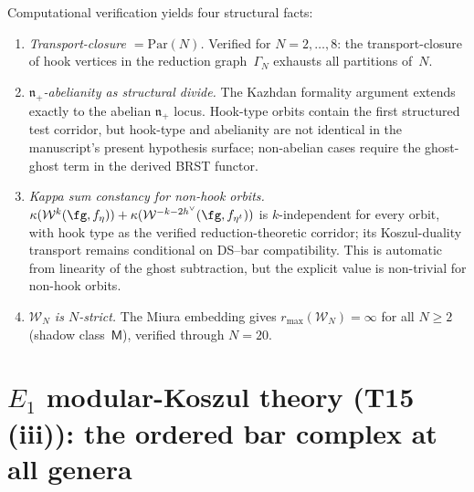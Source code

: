 \begin{remark}
\label{rem:transport-closure-diagnostics}
Computational verification yields four structural facts:
\begin{enumerate}[label=\textup{(\roman*)},nosep]
\item \emph{Transport-closure $= \mathrm{Par}(N)$.}
 Verified for $N = 2, \ldots, 8$: the transport-closure
 of hook vertices in the reduction graph~$\Gamma_N$
 exhausts all partitions of~$N$.
\item \emph{$\mathfrak{n}_+$-abelianity as structural divide.}
 The Kazhdan formality argument extends exactly to the abelian
 $\mathfrak{n}_+$ locus. Hook-type orbits contain the first structured
 test corridor, but hook-type and abelianity are not identical in the
 manuscript's present hypothesis surface; non-abelian cases require
 the ghost-ghost term in the derived BRST functor.
\item \emph{Kappa sum constancy for non-hook orbits.}
	 $\kappa(\mathcal{W}^k(\fg, f_\eta))
	 + \kappa(\mathcal{W}^{-k-2h^\vee}(\fg, f_{\eta^t}))$
	 is $k$-independent for every orbit, with hook type as the
	 verified reduction-theoretic corridor; its Koszul-duality
	 transport remains conditional on DS--bar compatibility.
 This is automatic from linearity of the ghost subtraction,
 but the explicit value is non-trivial for non-hook orbits.
\item \emph{$\mathcal{W}_N$ is $N$-strict.}
 The Miura embedding gives $r_{\max}(\mathcal{W}_N) = \infty$
 for all $N \geq 2$ (shadow class~$\mathsf{M}$),
 verified through $N = 20$.
\end{enumerate}
\end{remark}


\section{\texorpdfstring{$E_1$}{E1} modular-Koszul theory (T15 (iii)):
the ordered bar complex at all genera}
\label{sec:concordance-e1-modular-theory}

